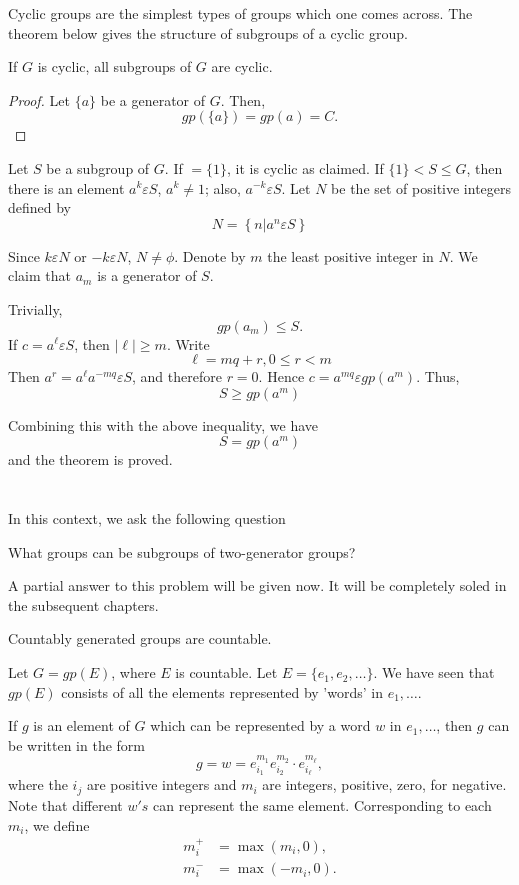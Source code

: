 Cyclic groups are the simplest types of groups which one comes
across. The theorem below gives the structure of subgroups of a cyclic
group. 
\begin{Theorem}%
  If $G$ is cyclic, all subgroups of $G$ are cyclic.
\end{Theorem}

\begin{proof}
  Let $\{ a \}$ be a generator of $G$. Then,
  $$
  gp(\{ a \}) = gp(a) = C.
  $$
\end{proof}

Let $S$ be a subgroup of $G$. If $= \{ 1 \}$, it is cyclic as
claimed. If $\{ 1 \} < S \leq G$, then there is an element $a^k
\varepsilon S$, $a^k \neq 1$; also, $a^{-k} \varepsilon S$. Let $N$ be
the set of positive integers defined by  
$$
N= \left\{ n \Big| a^n \varepsilon S \right\}
$$

Since $k \varepsilon N$ or $-k \varepsilon N$, $N \neq \phi$. Denote
by $m$ the least positive integer in $N$. We claim that $a_m$ is a
generator of $S$. 

Trivially, 
$$
gp(a_m) \leq S.
$$
If $c = a^\ell \varepsilon S$, then $|\ell |\geq m$. Write
$$
\ell = mq + r, 0 \leq r<m
$$
Then $a^r = a^\ell a^{-mq} \varepsilon S$, and therefore $r=0$. Hence
$c=a^{mq} \varepsilon gp(a^m)$. Thus, 
$$
S \geq gp(a^m)
$$

Combining this with the above inequality, we have 
$$
S= gp(a^m)
$$
and the theorem is proved.

\section{}%

In this context, we ask the following question
\begin{problem}
  What groups can be subgroups of two-generator groups? 
\end{problem}
 
A partial answer to this problem will be given now. It will be
completely soled in the subsequent chapters.
\begin{Theorem}%
  Countably generated groups are countable.
\end{Theorem}

Let $G = gp(E)$, where $E$ is countable. Let $E = \big\{ e_1,
e_2,\ldots \big\}$. We have seen that $gp(E)$ consists of all the
elements represented by 'words' in $e_1, \ldots$. 

If $g$ is an element of $G$ which can be represented by a word $w$ in
$e_1, \ldots$, then $g$ can be written in the form 
$$
g = w = e^{m_1}_{i_1} e^{m_2}_{i_2} \cdot e^{m_\ell}_{i_\ell},
$$
where the $i_j$ are positive integers and $m_i$ are integers,
positive, zero, for negative. Note that different $w' s$ can represent
the same element. Corresponding to each $m_i$, we define 
\begin{align*}
  m^+_i &= \max (m_i, 0),\\
  m^-_i &= \max (-m_i, 0).
\end{align*}

